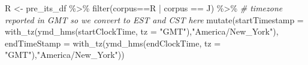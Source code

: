 \documentclass[
]{article}
\newenvironment{Shaded}{\begin{snugshade}}{\end{snugshade}}
\newcommand{\AttributeTok}[1]{\textcolor[rgb]{0.77,0.63,0.00}{#1}}
\newcommand{\CommentTok}[1]{\textcolor[rgb]{0.56,0.35,0.01}{\textit{#1}}}
\newcommand{\FunctionTok}[1]{\textcolor[rgb]{0.00,0.00,0.00}{#1}}
\newcommand{\NormalTok}[1]{#1}
\newcommand{\OtherTok}[1]{\textcolor[rgb]{0.56,0.35,0.01}{#1}}
\newcommand{\SpecialCharTok}[1]{\textcolor[rgb]{0.00,0.00,0.00}{#1}}
\newcommand{\StringTok}[1]{\textcolor[rgb]{0.31,0.60,0.02}{#1}}
\begin{document}
\begin{Shaded}
\begin{Highlighting}[]
\NormalTok{R }\OtherTok{\textless{}{-}}\NormalTok{ pre\_its\_df }\SpecialCharTok{\%\textgreater{}\%} 
  \FunctionTok{filter}\NormalTok{(corpus}\SpecialCharTok{==}\StringTok{\textquotesingle{}R\textquotesingle{}} \SpecialCharTok{|}\NormalTok{ corpus }\SpecialCharTok{==} \StringTok{\textquotesingle{}J\textquotesingle{}}\NormalTok{) }\SpecialCharTok{\%\textgreater{}\%} \CommentTok{\# timezone reported in GMT so we convert to EST and CST here }
  \FunctionTok{mutate}\NormalTok{(}\AttributeTok{startTimestamp =} \FunctionTok{with\_tz}\NormalTok{(}\FunctionTok{ymd\_hms}\NormalTok{(startClockTime, }\AttributeTok{tz =} \StringTok{"GMT"}\NormalTok{),}\StringTok{"America/New\_York"}\NormalTok{),}
         \AttributeTok{endTimeStamp =} \FunctionTok{with\_tz}\NormalTok{(}\FunctionTok{ymd\_hms}\NormalTok{(endClockTime, }\AttributeTok{tz =} \StringTok{"GMT"}\NormalTok{),}\StringTok{"America/New\_York"}\NormalTok{)) }


\end{Highlighting}
\end{Shaded}
\end{document}

